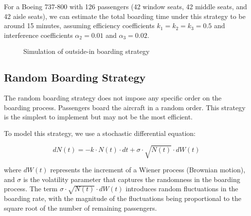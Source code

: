 \documentclass[12pt,a4paper]{article}
\begin{document}
For a Boeing 737-800 with 126 passengers (42 window seats, 42 middle seats, and 42 aisle seats), we can estimate the total boarding time under this strategy to be around 15 minutes, assuming efficiency coefficients $k_1 = k_2 = k_3 = 0.5$ and interference coefficients $\alpha_2 = 0.01$ and $\alpha_3 = 0.02$.

\begin{figure}[H]
\centering
{}
\caption{Simulation of outside-in boarding strategy}
\label{fig:outside_in}
\end{figure}

\subsection{Random Boarding Strategy}

The random boarding strategy does not impose any specific order on the boarding process. Passengers board the aircraft in a random order. This strategy is the simplest to implement but may not be the most efficient.

To model this strategy, we use a stochastic differential equation:

\begin{equation}
dN(t) = -k \cdot N(t) \cdot dt + \sigma \cdot \sqrt{N(t)} \cdot dW(t)
\label{eq:random_boarding}
\end{equation}

where $dW(t)$ represents the increment of a Wiener process (Brownian motion), and $\sigma$ is the volatility parameter that captures the randomness in the boarding process. The term $\sigma \cdot \sqrt{N(t)} \cdot dW(t)$ introduces random fluctuations in the boarding rate, with the magnitude of the fluctuations being proportional to the square root of the number of remaining passengers.
\end{document}
